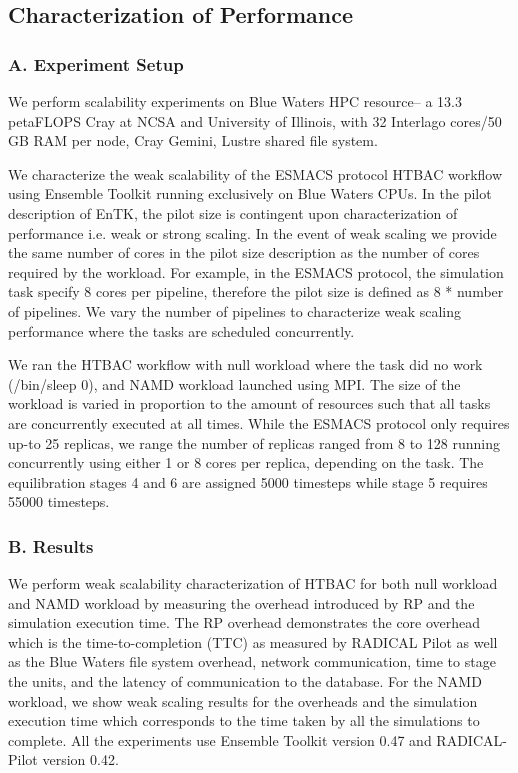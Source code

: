 \subsection{Characterization of Performance}

\subsubsection{A. Experiment Setup}

We perform scalability experiments on Blue Waters HPC resource-- a 13.3 petaFLOPS Cray at NCSA and University of Illinois, with 32 Interlago cores/50 GB RAM per node, Cray Gemini, Lustre shared file system. 

We characterize the weak scalability of the ESMACS protocol HTBAC workflow using Ensemble Toolkit running exclusively on Blue Waters CPUs. In the pilot description of EnTK, the pilot size is contingent upon characterization of performance i.e. weak or strong scaling. In the event of weak scaling we provide the same number of cores in the pilot size description as the number of cores required by the workload. For example, in the ESMACS protocol, the simulation task specify 8 cores per pipeline, therefore the pilot size is defined as 8 * number of pipelines. We vary the number of pipelines to characterize weak scaling performance where the tasks are scheduled concurrently.

We ran the HTBAC workflow with null workload where the task did no work (/bin/sleep 0), and NAMD workload launched using MPI. The size of the workload is varied in proportion to the amount of resources such that all tasks are concurrently executed at all times. While the ESMACS protocol only requires up-to 25 replicas, we range the number of replicas ranged from 8 to 128 running concurrently using either 1 or 8 cores per replica, depending on the task. The equilibration stages 4 and 6 are assigned 5000 timesteps while stage 5 requires 55000 timesteps. 

\subsubsection{B. Results}

We perform weak scalability characterization of HTBAC for both null workload and NAMD workload by measuring the overhead introduced by RP and the simulation execution time. The RP overhead demonstrates the core overhead which is the time-to-completion (TTC) as measured by RADICAL Pilot as well as the Blue Waters file system overhead, network communication, time to stage the units, and the latency of communication to the database. For the NAMD workload, we show weak scaling results for the overheads and the simulation execution time which corresponds to the time taken by all the simulations to complete. All the experiments use Ensemble Toolkit version 0.47 and RADICAL-Pilot version 0.42. 


